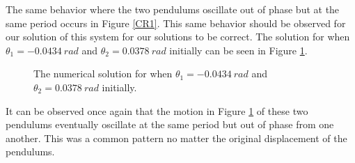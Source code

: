 \documentclass[twocolumn]{article}
\begin{document}
\newpage
The same behavior where the two pendulums oscillate out of phase but at the same period occurs in Figure \ref{CR1}. This same behavior should be observed for our solution of this system for our solutions to be correct. The solution for when $\theta_1=-0.0434 \ rad$ and $\theta_2=0.0378 \ rad$ initially can be seen in Figure \ref{CR2}.
\begin{figure}[htb!]
\begin{center}
\caption{The numerical solution for when $\theta_1=-0.0434 \ rad$ and $\theta_2=0.0378 \ rad$ initially.}
\label{CR2}
\end{center}
\end{figure}
\newpage
It can be observed once again that the motion in Figure \ref{CR2} of these two pendulums eventually oscillate at the same period but out of phase from one another. This was a common pattern no matter the original displacement of the pendulums.
\end{document}
